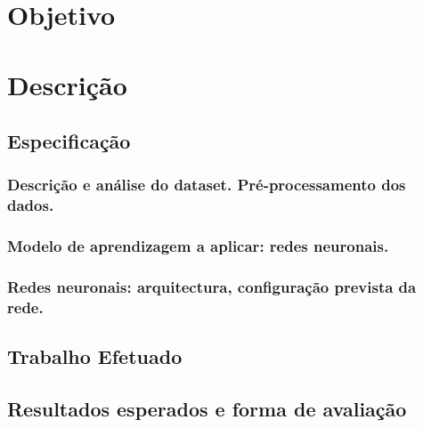 \documentclass[a4paper]{article}
\begin{document}
\tableofcontents

\newpage


\section{Objetivo}

\newpage


\section{Descrição}

\subsection{Especificação}

\subsubsection{Descrição e análise do dataset. Pré-processamento dos dados.}

\subsubsection{Modelo de aprendizagem a aplicar: redes neuronais.}

\subsubsection{Redes neuronais: arquitectura, configuração prevista da rede.}


\subsection{Trabalho Efetuado}

\subsection{Resultados esperados e forma de avaliação}
\end{document}

